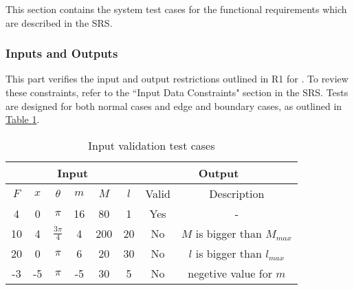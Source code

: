 \documentclass[12pt, titlepage]{article}
\begin{document}
This section contains the system test cases for the functional 
requirements which are described in the SRS.



\subsubsection{Inputs and Outputs}

This part verifies the input and output restrictions outlined in R1 for \progname{}.
To review these constraints, refer to the ``Input Data Constraints" section in the SRS.
Tests are designed for both normal cases and edge and boundary cases, as outlined 
in \hyperref[table:input_constraints]{Table \ref*{table:input_constraints}}.


\begin{table}[ht]
\centering
\caption{Input validation test cases} \label{table:input_constraints}
\vspace*{2mm}
 \begin{tabular}{|c c c c c c|c|c|} 
 \hline
 \multicolumn{6}{|c|}{Input}                     & \multicolumn{2}{c|}{Output}            \\ \hline 
  $F$ & $x$ & $\theta$         & $m$ & $M$ & $l$ & Valid  &  Description                  \\ \hline
  4   & 0   & $\pi$            & 16  & 80  &  1  & Yes    &  -                            \\ \hline
  10  & 4   & $\frac{3\pi}{4}$ & 4   & 200 &  20 & No     &  $M$ is bigger than $M_{max}$ \\ \hline
  20  & 0   & $\pi$            & 6   & 20  &  30 & No     &  $l$ is bigger than $l_{max}$ \\ \hline
  -3  & -5  & $\pi$            & -5  & 30  &  5  & No     &  negetive value for $m$       \\ \hline
\end{tabular}
\end{table}  
\end{document}
